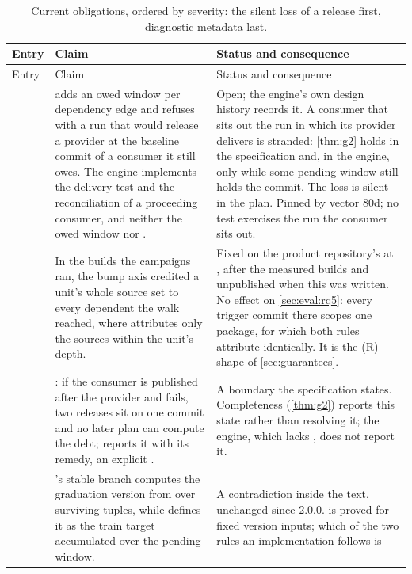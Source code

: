 \begin{center}
\small
\begin{longtable}{@{}L{2.2cm}L{6.2cm}L{5.6cm}@{}}
\caption{Current obligations, ordered by severity: the silent loss of a
release first, diagnostic metadata last.}
\label{tab:departures}\\
\toprule
Entry & Claim & Status and consequence \\
\midrule
\endfirsthead
\toprule
Entry & Claim & Status and consequence \\
\midrule
\endhead
{} &  adds an owed window per dependency edge and
 refuses with  a run that would release a provider at
the baseline commit of a consumer it still owes. The engine implements the
delivery test and the reconciliation of a proceeding consumer, and neither the
owed window nor . & Open; the engine's own design history records
it. A consumer that sits out the run in which its provider delivers is
stranded: \cref{thm:g2} holds in the specification and, in the engine, only
while some pending window still holds the commit. The loss is silent in the
plan. Pinned by vector 80d; no test exercises the run the consumer sits out. \\
 & In the builds the campaigns ran, the bump axis credited
a unit's whole source set to every dependent the walk reached, where
 attributes only the sources within the unit's depth. & Fixed on the
product repository's  at , after the measured builds
and unpublished when this was written. No effect on \cref{sec:eval:rq5}: every
trigger commit there scopes one package, for which both rules attribute
identically. It is the (R) shape of \cref{sec:guarantees}. \\
 & : if the consumer is published after the
provider and fails, two releases sit on one commit and no later plan can
compute the debt;  reports it with its remedy, an explicit
. & A boundary the specification states. Completeness
(\cref{thm:g2}) reports this state rather than resolving it; the engine, which
lacks , does not report it. \\
 & 's stable branch computes the graduation
version from  over surviving tuples, while 
defines it as the train target accumulated over the pending window. & A
contradiction inside the text, unchanged since 2.0.0.  is proved
for fixed version inputs; which of the two rules an implementation follows is

\end{longtable}
\end{center}
